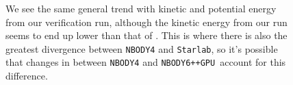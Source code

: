 \documentclass{princeton_astro_thesis}
\newcommand\nbody{\texttt{NBODY6++GPU }}
\numberwithin{equation}{section}
\begin{document}
\begin{figure}%
    \centering
    \qquad   
    \qquad
    \qquad
    \caption{We see the same general trend with kinetic and potential energy from our verification run, although the kinetic energy from our run seems to end up lower than that of \citet{2009Anders}.  This is where there is also the greatest divergence between \texttt{NBODY4} and \texttt{Starlab}, so it's possible that changes in between \texttt{NBODY4} and \nbody account for this difference.}
    \label{fig:verifications2}
\end{figure}
\end{document}
